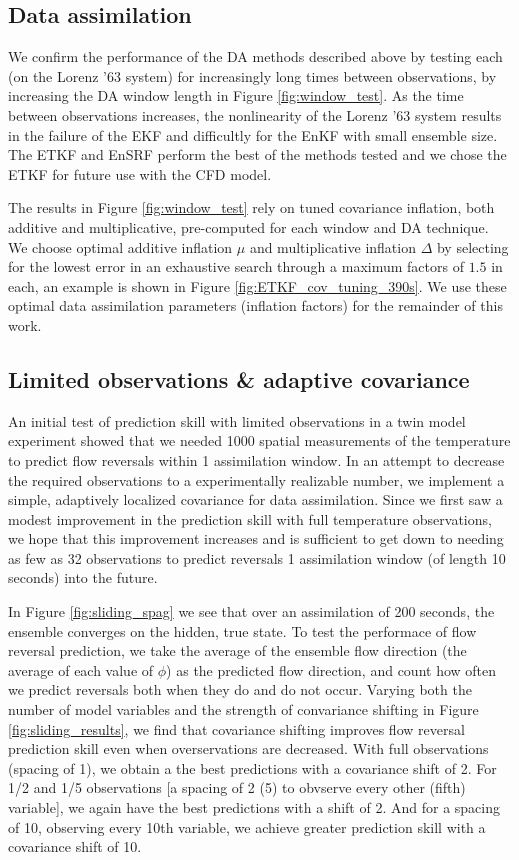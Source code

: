 \subsection{Data assimilation}

We confirm the performance of the DA methods described above by testing each (on the Lorenz '63 system) for increasingly long times between observations, by increasing the DA window length in Figure \ref{fig:window_test}.
As the time between observations increases, the nonlinearity of the Lorenz '63 system results in the failure of the EKF and difficultly for the EnKF with small ensemble size.
The ETKF and EnSRF perform the best of the methods tested and we chose the ETKF for future use with the CFD model.

The results in Figure \ref{fig:window_test} rely on tuned covariance inflation, both additive and multiplicative, pre-computed for each window and DA technique.
We choose optimal additive inflation $\mu$ and multiplicative inflation $\Delta$ by selecting for the lowest error in an exhaustive search through a maximum factors of $1.5$ in each, an example is shown in Figure \ref{fig:ETKF_cov_tuning_390s}.
We use these optimal data assimilation parameters (inflation factors) for the remainder of this work.

\subsection{Limited observations \& adaptive covariance}

An initial test of prediction skill with limited observations in a twin model experiment showed that we needed 1000 spatial measurements of the temperature to predict flow reversals within 1 assimilation window.
In an attempt to decrease the required observations to a experimentally realizable number, we implement a simple, adaptively localized covariance for data assimilation.
Since we first saw a modest improvement in the prediction skill with full temperature observations, we hope that this improvement increases and is sufficient to get down to needing as few as 32 observations to predict reversals 1 assimilation window (of length 10 seconds) into the future.

In Figure \ref{fig:sliding_spag} we see that over an assimilation of 200 seconds, the ensemble converges on the hidden, true state.
To test the performace of flow reversal prediction, we take the average of the ensemble flow direction (the average of each value of $\phi$) as the predicted flow direction, and count how often we predict reversals both when they do and do not occur.
Varying both the number of model variables and the strength of convariance shifting in Figure \ref{fig:sliding_results}, we find that covariance shifting improves flow reversal prediction skill even when overservations are decreased.
With full observations (spacing of 1), we obtain a the best predictions with a covariance shift of 2.
For 1/2 and 1/5 observations [a spacing of 2 (5) to obvserve every other (fifth) variable], we again have the best predictions with a shift of 2.
And for a spacing of 10, observing every 10th variable, we achieve greater prediction skill with a covariance shift of 10.

